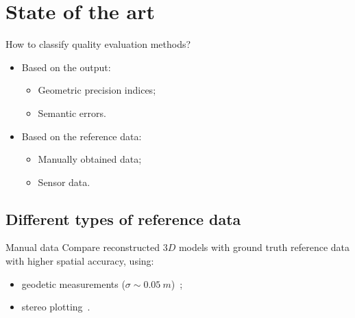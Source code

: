 \documentclass{beamer}
\begin{document}
    \section{State of the art}
        \begin{frame}{How to classify quality evaluation methods?}
            \begin{itemize}[
                    label=$\blacktriangleright$,
                    font=\color{IGNGreen},
                    itemsep=2em
                ]
                \item<1-> Based on the output:
                \begin{itemize}[label=--, itemsep=1em]
                    \item<2-> Geometric precision indices;
                    \item<2-> Semantic errors.
                \end{itemize}
                \item<3-> Based on the reference data:
                \begin{itemize}[label=--, itemsep=1em]
                    \item<4-> Manually obtained data;
                    \item<4-> Sensor data.
                \end{itemize}
            \end{itemize}
        \end{frame}
        \subsection{Different types of reference data}
            \begin{frame}{Manual data}
                Compare reconstructed $3D$ models with ground truth reference data with higher spatial accuracy, using:
                \begin{itemize}[label=$\blacktriangleright$, font=\color{IGNGreen}]
                    \item<1-> geodetic measurements ($ \sigma \sim \SI{0.05}{m}$)~\citep{Kaartinen2005, Voegtle2003};
                    \item<2-> stereo plotting~\citep{Kaartinen2005, Zeng2014}.
                \end{itemize}
            \end{frame}
\end{document}
